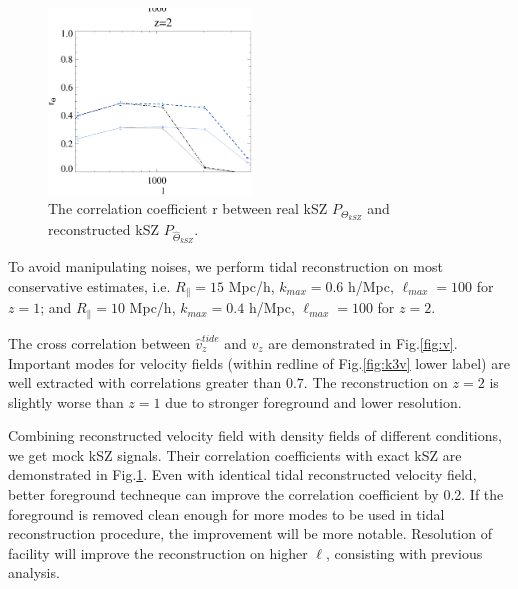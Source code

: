 \begin{figure}[tbp]
\begin{center}
\includegraphics[width=0.48\textwidth]{figure/cl_correlation_z1_z2.eps}
\end{center}
\vspace{-0.7cm}
\caption{The correlation coefficient r between real kSZ $P_{\Theta_{kSZ}}$ 
and reconstructed kSZ $P_{\hat \Theta_{kSZ}}$.
}
\label{fig:r}
\end{figure}
\label{ssec:tide}
To avoid manipulating noises, 
we perform tidal reconstruction on most conservative estimates, i.e. 
$R_\parallel=15$ Mpc/h, $k_{max}=0.6$ h/Mpc, $\ell_{max}=100$ for $z=1$; 
and $R_\parallel=10$ Mpc/h, $k_{max}=0.4$ h/Mpc, $\ell_{max}=100$ for $z=2$. 

The cross correlation between $\hat v_z^{tide}$ and $v_z$ are demonstrated in Fig.\ref{fig:v}. 
Important modes for velocity fields (within redline of Fig.\ref{fig:k3v} lower label) are well extracted with correlations greater than $0.7$. 
The reconstruction on $z=2$ is slightly worse than $z=1$ 
due to stronger foreground and lower resolution. 

Combining reconstructed velocity field with density fields of different conditions, we get mock kSZ signals. 
Their correlation coefficients with exact kSZ are 
demonstrated in Fig.\ref{fig:r}. 
Even with identical tidal reconstructed velocity field, 
better foreground techneque can improve the correlation coefficient by 0.2. 
If the foreground is removed clean enough for more modes to be 
used in tidal reconstruction procedure, 
the improvement will be more notable.
Resolution of facility will improve the reconstruction on higher $\ell$, 
consisting with previous analysis.



